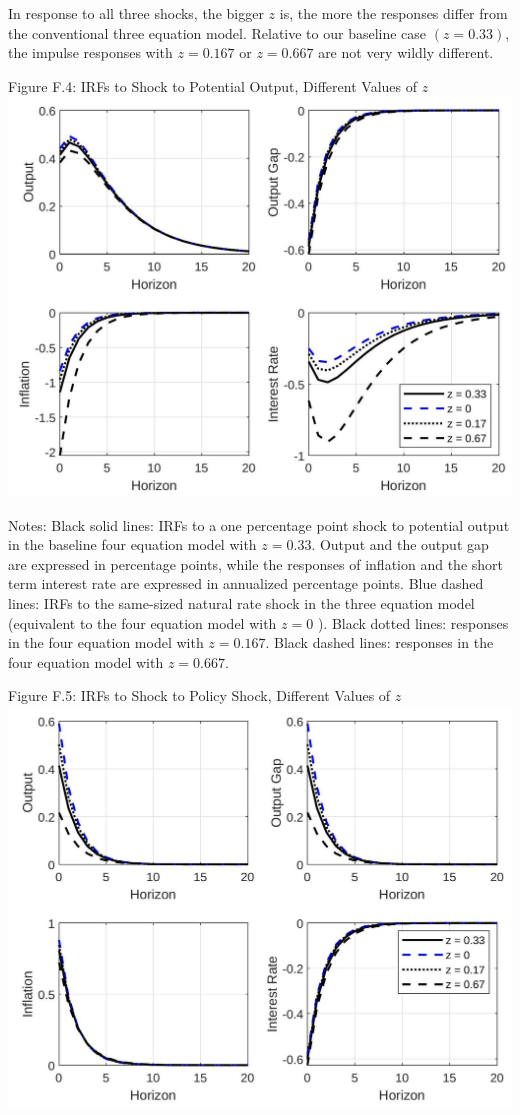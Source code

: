 \documentclass[10pt]{article}
\begin{document}
In response to all three shocks, the bigger $z$ is, the more the responses differ from the conventional three equation model. Relative to our baseline case $(z=0.33)$, the impulse responses with $z=0.167$ or $z=0.667$ are not very wildly different.

Figure F.4: IRFs to Shock to Potential Output, Different Values of $z$\\
\includegraphics[max width=\textwidth, center]{2024_12_20_23d1456f4ac472ebd83dg-14}

Notes: Black solid lines: IRFs to a one percentage point shock to potential output in the baseline four equation model with $z=0.33$. Output and the output gap are expressed in percentage points, while the responses of inflation and the short term interest rate are expressed in annualized percentage points. Blue dashed lines: IRFs to the same-sized natural rate shock in the three equation model (equivalent to the four equation model with $z=0$ ). Black dotted lines: responses in the four equation model with $z=0.167$. Black dashed lines: responses in the four equation model with $z=0.667$.

Figure F.5: IRFs to Shock to Policy Shock, Different Values of $z$\\
\includegraphics[max width=\textwidth, center]{2024_12_20_23d1456f4ac472ebd83dg-15}
\end{document}
